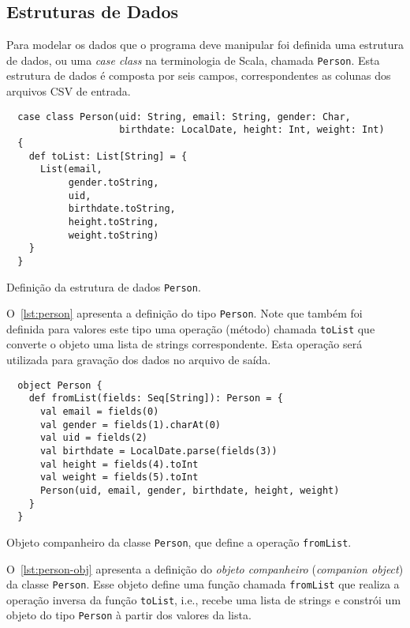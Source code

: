 \documentclass[a4paper,12pt]{scrartcl}
\begin{document}
\subsection{Estruturas de Dados}
\label{sec:estruturas-de-dados}

Para modelar os dados que o programa deve manipular foi definida uma estrutura
de dados, ou uma \emph{case class} na terminologia de Scala, chamada
\texttt{Person}. Esta estrutura de dados é composta por seis campos,
correspondentes as colunas dos arquivos CSV de entrada.

\begin{listing}[h]
\begin{verbatim}
  case class Person(uid: String, email: String, gender: Char,
                    birthdate: LocalDate, height: Int, weight: Int)
  {
    def toList: List[String] = {
      List(email,
           gender.toString,
           uid,
           birthdate.toString,
           height.toString,
           weight.toString)
    }
  }
\end{verbatim}
\caption{Definição da estrutura de dados \texttt{Person}.}
\label{lst:person}
\end{listing}

O~\autoref{lst:person} apresenta a definição do tipo \texttt{Person}.
Note que também foi definida para valores este tipo uma operação (método)
chamada \texttt{toList} que converte o objeto uma lista de strings
correspondente. Esta operação será utilizada para gravação dos dados no arquivo
de saída.

\begin{listing}[h]
\begin{verbatim}
  object Person {
    def fromList(fields: Seq[String]): Person = {
      val email = fields(0)
      val gender = fields(1).charAt(0)
      val uid = fields(2)
      val birthdate = LocalDate.parse(fields(3))
      val height = fields(4).toInt
      val weight = fields(5).toInt
      Person(uid, email, gender, birthdate, height, weight)
    }
  }
\end{verbatim}
\caption{Objeto companheiro da classe \texttt{Person}, que define a operação
\texttt{fromList}.}
\label{lst:person-obj}
\end{listing}

O~\autoref{lst:person-obj} apresenta a definição do \emph{objeto companheiro}
(\emph{companion object}) da classe \texttt{Person}. Esse objeto
define uma função chamada \texttt{fromList} que realiza a operação
inversa da função \texttt{toList}, i.e., recebe uma lista de strings
e constrói um objeto do tipo \texttt{Person} à partir dos valores da
lista.
\end{document}
